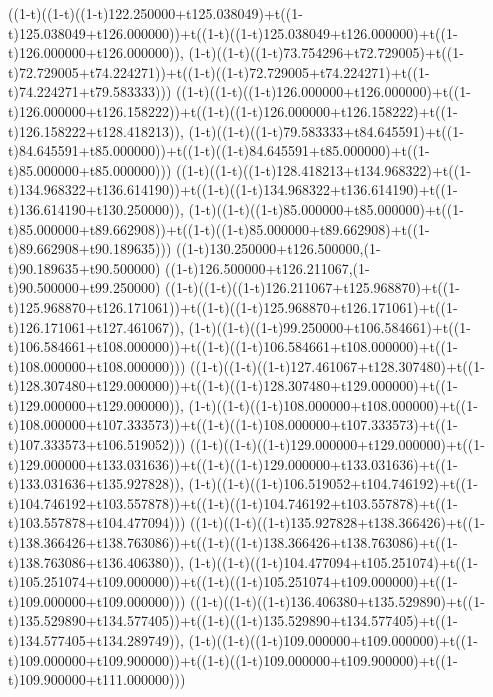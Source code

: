 ((1-t)((1-t)((1-t)122.250000+t125.038049)+t((1-t)125.038049+t126.000000))+t((1-t)((1-t)125.038049+t126.000000)+t((1-t)126.000000+t126.000000)),                                     (1-t)((1-t)((1-t)73.754296+t72.729005)+t((1-t)72.729005+t74.224271))+t((1-t)((1-t)72.729005+t74.224271)+t((1-t)74.224271+t79.583333)))
((1-t)((1-t)((1-t)126.000000+t126.000000)+t((1-t)126.000000+t126.158222))+t((1-t)((1-t)126.000000+t126.158222)+t((1-t)126.158222+t128.418213)),                                     (1-t)((1-t)((1-t)79.583333+t84.645591)+t((1-t)84.645591+t85.000000))+t((1-t)((1-t)84.645591+t85.000000)+t((1-t)85.000000+t85.000000)))
((1-t)((1-t)((1-t)128.418213+t134.968322)+t((1-t)134.968322+t136.614190))+t((1-t)((1-t)134.968322+t136.614190)+t((1-t)136.614190+t130.250000)),                                     (1-t)((1-t)((1-t)85.000000+t85.000000)+t((1-t)85.000000+t89.662908))+t((1-t)((1-t)85.000000+t89.662908)+t((1-t)89.662908+t90.189635)))
((1-t)130.250000+t126.500000,(1-t)90.189635+t90.500000)
((1-t)126.500000+t126.211067,(1-t)90.500000+t99.250000)
((1-t)((1-t)((1-t)126.211067+t125.968870)+t((1-t)125.968870+t126.171061))+t((1-t)((1-t)125.968870+t126.171061)+t((1-t)126.171061+t127.461067)),                                     (1-t)((1-t)((1-t)99.250000+t106.584661)+t((1-t)106.584661+t108.000000))+t((1-t)((1-t)106.584661+t108.000000)+t((1-t)108.000000+t108.000000)))
((1-t)((1-t)((1-t)127.461067+t128.307480)+t((1-t)128.307480+t129.000000))+t((1-t)((1-t)128.307480+t129.000000)+t((1-t)129.000000+t129.000000)),                                     (1-t)((1-t)((1-t)108.000000+t108.000000)+t((1-t)108.000000+t107.333573))+t((1-t)((1-t)108.000000+t107.333573)+t((1-t)107.333573+t106.519052)))
((1-t)((1-t)((1-t)129.000000+t129.000000)+t((1-t)129.000000+t133.031636))+t((1-t)((1-t)129.000000+t133.031636)+t((1-t)133.031636+t135.927828)),                                     (1-t)((1-t)((1-t)106.519052+t104.746192)+t((1-t)104.746192+t103.557878))+t((1-t)((1-t)104.746192+t103.557878)+t((1-t)103.557878+t104.477094)))
((1-t)((1-t)((1-t)135.927828+t138.366426)+t((1-t)138.366426+t138.763086))+t((1-t)((1-t)138.366426+t138.763086)+t((1-t)138.763086+t136.406380)),                                     (1-t)((1-t)((1-t)104.477094+t105.251074)+t((1-t)105.251074+t109.000000))+t((1-t)((1-t)105.251074+t109.000000)+t((1-t)109.000000+t109.000000)))
((1-t)((1-t)((1-t)136.406380+t135.529890)+t((1-t)135.529890+t134.577405))+t((1-t)((1-t)135.529890+t134.577405)+t((1-t)134.577405+t134.289749)),                                     (1-t)((1-t)((1-t)109.000000+t109.000000)+t((1-t)109.000000+t109.900000))+t((1-t)((1-t)109.000000+t109.900000)+t((1-t)109.900000+t111.000000)))
